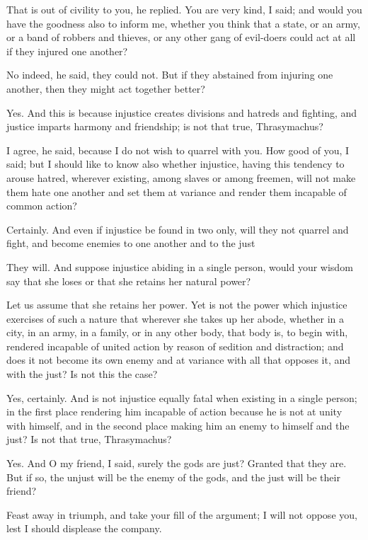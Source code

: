 That is out of civility to you, he replied.
You are very kind, I said; and would you have the goodness also to inform me, whether you think that a state, or an army, or a band of robbers and thieves, or any other gang of evil-doers could act at all if they injured one another?

No indeed, he said, they could not.
But if they abstained from injuring one another, then they might act together better?

Yes.
And this is because injustice creates divisions and hatreds and fighting, and justice imparts harmony and friendship; is not that true, Thrasymachus?

I agree, he said, because I do not wish to quarrel with you.
How good of you, I said; but I should like to know also whether injustice, having this tendency to arouse hatred, wherever existing, among slaves or among freemen, will not make them hate one another and set them at variance and render them incapable of common action?

Certainly.
And even if injustice be found in two only, will they not quarrel and fight, and become enemies to one another and to the just

They will.
And suppose injustice abiding in a single person, would your wisdom say that she loses or that she retains her natural power?

Let us assume that she retains her power.
Yet is not the power which injustice exercises of such a nature that wherever she takes up her abode, whether in a city, in an army, in a family, or in any other body, that body is, to begin with, rendered incapable of united action by reason of sedition and distraction; and does it not become its own enemy and at variance with all that opposes it, and with the just? Is not this the case?

Yes, certainly.
And is not injustice equally fatal when existing in a single person; in the first place rendering him incapable of action because he is not at unity with himself, and in the second place making him an enemy to himself and the just? Is not that true, Thrasymachus?

Yes.
And O my friend, I said, surely the gods are just?
Granted that they are.
But if so, the unjust will be the enemy of the gods, and the just will be their friend?

Feast away in triumph, and take your fill of the argument; I will not oppose you, lest I should displease the company.

